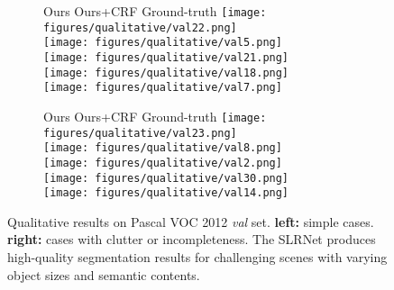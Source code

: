 \documentclass[twocolumn]{svjour3}          \smartqed  \usepackage{graphicx}
\begin{document}
\begin{figure*}[t]
    \begin{subfigure}[t]{0.5\linewidth}
        \centering
        \hspace{0.5cm}Ours\hspace{1.8cm} Ours+CRF \hspace{1cm}  Ground-truth
\texttt{[image: figures/qualitative/val22.png]}\\
        \texttt{[image: figures/qualitative/val5.png]}\\
\texttt{[image: figures/qualitative/val21.png]}\\

        \texttt{[image: figures/qualitative/val18.png]}\\
        \texttt{[image: figures/qualitative/val7.png]}\\

\end{subfigure}\begin{subfigure}[t]{0.5\linewidth}
        \centering
        \hspace{0.5cm}Ours\hspace{1.8cm} Ours+CRF \hspace{1cm}  Ground-truth
\texttt{[image: figures/qualitative/val23.png]}\\
        \texttt{[image: figures/qualitative/val8.png]}\\
        \texttt{[image: figures/qualitative/val2.png]}\\

        \texttt{[image: figures/qualitative/val30.png]}\\
\texttt{[image: figures/qualitative/val14.png]}\\
\end{subfigure}\caption{{Qualitative results on Pascal VOC 2012 \textit{val} set.}
    \textbf{left:} simple cases. \textbf{right:} cases with clutter or incompleteness.
    The SLRNet produces high-quality segmentation results for challenging scenes with varying object sizes and semantic contents.
    }
    \label{fig:qualitative}\vspace{-0.5em}
\end{figure*}
\end{document}
